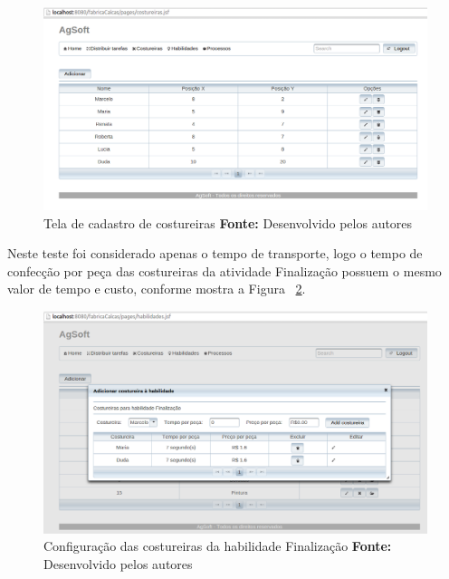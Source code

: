\begin{figure}[h!]
	\centerline{\includegraphics[scale=0.3]{./imagens/posicao_xy_costureiras_teste4.png}}
	\caption[Tela de cadastro de costureiras]
	{Tela de cadastro de costureiras \textbf{Fonte:} Desenvolvido pelos autores}
	\label{fig:add_xy_costureira_teste4}
\end{figure}



\par Neste teste foi considerado apenas o tempo de transporte, logo o tempo de
confecção por peça das costureiras da atividade Finalização possuem o mesmo
valor de tempo e custo, conforme mostra a Figura
~\ref{fig:at_finalizacao_teste4}.


\begin{figure}[h!]
	\centerline{\includegraphics[scale=0.3]{./imagens/cofig_at_finalizaca_teste4.png}}
	\caption[Configuração das costureiras da habilidade Finalização]
	{Configuração das costureiras da habilidade Finalização \textbf{Fonte:} Desenvolvido pelos autores}
	\label{fig:at_finalizacao_teste4}
\end{figure}

